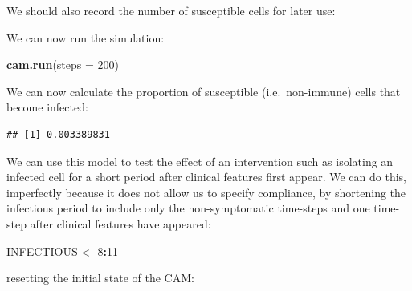 \documentclass[12pt,a4paper]{book}
\newenvironment{Shaded}{\begin{snugshade}}{\end{snugshade}}
\newcommand{\DataTypeTok}[1]{\textcolor[rgb]{0.13,0.29,0.53}{#1}}
\newcommand{\DecValTok}[1]{\textcolor[rgb]{0.00,0.00,0.81}{#1}}
\newcommand{\KeywordTok}[1]{\textcolor[rgb]{0.13,0.29,0.53}{\textbf{#1}}}
\newcommand{\NormalTok}[1]{#1}
\newcommand{\OperatorTok}[1]{\textcolor[rgb]{0.81,0.36,0.00}{\textbf{#1}}}
\newcommand{\StringTok}[1]{\textcolor[rgb]{0.31,0.60,0.02}{#1}}
\theoremstyle{definition}
\theoremstyle{definition}
\theoremstyle{definition}
\theoremstyle{remark}
\begin{document}
We should also record the number of susceptible cells for later use:

\begin{Shaded}
\end{Shaded}

We can now run the simulation:

\begin{Shaded}
\begin{Highlighting}[]
\KeywordTok{cam.run}\NormalTok{(}\DataTypeTok{steps =} \DecValTok{200}\NormalTok{)}
\end{Highlighting}
\end{Shaded}

We can now calculate the proportion of susceptible (i.e.~non-immune)
cells that become infected:

\begin{Shaded}
\end{Shaded}

\begin{verbatim}
## [1] 0.003389831
\end{verbatim}

We can use this model to test the effect of an intervention such as
isolating an infected cell for a short period after clinical features
first appear. We can do this, imperfectly because it does not allow us
to specify compliance, by shortening the infectious period to include
only the non-symptomatic time-steps and one time- step after clinical
features have appeared:

\begin{Shaded}
\begin{Highlighting}[]
\NormalTok{INFECTIOUS <-}\StringTok{ }\DecValTok{8}\OperatorTok{:}\DecValTok{11}
\end{Highlighting}
\end{Shaded}

resetting the initial state of the CAM:
\end{document}
